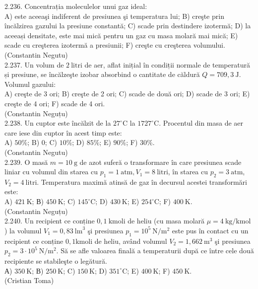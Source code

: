 \documentclass[10pt]{article}
\begin{document}
2.236. Concentrația moleculelor unui gaz ideal:\\ A) este aceeaşi indiferent de presiunea şi temperatura lui; B) creşte prin încălzirea gazului la presiune constantă; C) scade prin destindere izotermă; D) la aceeași densitate, este mai mică pentru un gaz cu masa molară mai mică; E) scade cu creşterea izotermă a presiunii; F) creşte cu creşterea volumului.\\ (Constantin Negutu)\\

2.237. Un volum de $2 \mathrm{~litri}$ de aer, aflat inițial în condiții normale de temperatură și presiune, se încălzeşte izobar absorbind o cantitate de căldură $Q=709,3 \mathrm{~J}$. Volumul gazului:\\ A) creşte de 3 ori; B) creşte de 2 ori; C) scade de două ori; D) scade de 3 ori; E) creşte de 4 ori; F) scade de 4 ori.\\ (Constantin Neguțu)\\

2.238. Un cuptor este încălzit de la $27^{\circ} \mathrm{C}$ la $1727^{\circ} \mathrm{C}$. Procentul din masa de aer care iese din cuptor în acest timp este:\\ A) $50 \%$; B) 0; C) $10 \%$; D) $85 \%$; E) $90 \%$; F) $30 \%$.\\ (Constantin Negutu)\\

2.239. O masă $m=10 \mathrm{~g}$ de azot suferă o transformare în care presiunea scade liniar cu volumul din starea cu $p_{1}=1 \mathrm{~atm}, V_{1}=8 \mathrm{~litri}$, în starea cu $p_{2}=3 \mathrm{~atm}$, $V_{2}=4 \mathrm{~litri}$. Temperatura maximă atinsă de gaz în decursul acestei transformări este:\\ A) $421 \mathrm{~K}$; В) $450 \mathrm{~K}$; C) $145^{\circ} \mathrm{C}$; D) $430 \mathrm{~K}$; E) $254^{\circ} \mathrm{C}$; F) $400 \mathrm{~K}$.\\ (Constantin Neguțu)\\

2.240. Un recipient ce conține $0,1 \mathrm{~kmoli}$ de heliu (cu masa molară $\mu=4 \mathrm{~kg} / \mathrm{kmol}$ ) la volumul $V_{1}=0,83 \mathrm{~lm}^{3}$ şi presiunea $p_{1}=10^{5} \mathrm{~N} / \mathrm{m}^{2}$ este pus în contact cu un recipient ce conține $0,1 \mathrm{kmoli}$ de heliu, având volumul $V_{2}=1,662 \mathrm{~m}^{3}$ şi presiunea $p_{2}=3 \cdot 10^{5} \mathrm{~N} / \mathrm{m}^{2}$. Să se afle valoarea finală a temperaturii după ce între cele două recipiente se stabileşte o legătură.\\ А) $350 \mathrm{~K}$; В) $250 \mathrm{~K}$; C) $150 \mathrm{~K}$; D) $351^{\circ} \mathrm{C}$; E) $400 \mathrm{~K}$; F) $450 \mathrm{~K}$.\\ (Cristian Toma)\\
\end{document}
